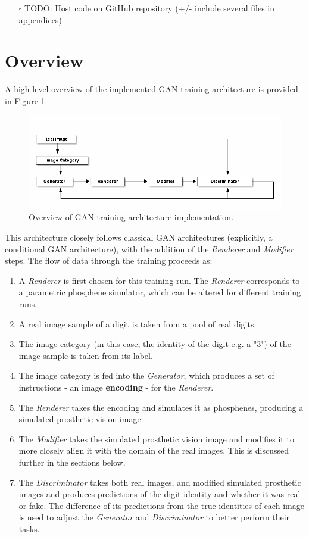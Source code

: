 \documentclass[11pt]{book}
\begin{document}
\begin{itemize}
\item[{$\square$}] TODO: Host code on GitHub repository (+/- include several files in appendices)
\end{itemize}

\section*{Overview}
\label{sec:org0aa64c8}

A high-level overview of the implemented GAN training architecture is provided in Figure \ref{fig:org3e45fac}.

\begin{figure}[htbp]
\centering
\includegraphics[width=.9\linewidth]{images/methods_training_architecture.png}
\caption{\label{fig:org3e45fac}
Overview of GAN training architecture implementation.}
\end{figure}

This architecture closely follows classical GAN architectures (explicitly, a conditional GAN architecture), with the addition of the \emph{Renderer} and \emph{Modifier} steps.
The flow of data through the training proceeds as:
\begin{enumerate}
\item A \emph{Renderer} is first chosen for this training run.
The \emph{Renderer} corresponds to a parametric phosphene simulator, which can be altered for different training runs.
\item A real image sample of a digit is taken from a pool of real digits.
\item The image category (in this case, the identity of the digit e.g. a "3") of the image sample is taken from its label.
\item The image category is fed into the \emph{Generator}, which produces a set of instructions - an image \textbf{encoding} - for the \emph{Renderer}.
\item The \emph{Renderer} takes the encoding and simulates it as phosphenes, producing a simulated prosthetic vision image.
\item The \emph{Modifier} takes the simulated prosthetic vision image and modifies it to more closely align it with the domain of the real images.
This is discussed further in the sections below.
\item The \emph{Discriminator} takes both real images, and modified simulated prosthetic images and produces predictions of the digit identity and whether it was real or fake.
The difference of its predictions from the true identities of each image is used to adjust the \emph{Generator} and \emph{Discriminator} to better perform their tasks.
\end{enumerate}
\end{document}
